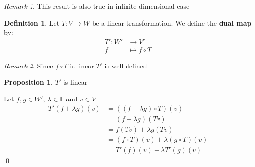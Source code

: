 \documentclass[11pt, a4paper]{report}
\makeatletter
\numberwithin{equation}{section}
\newcommand{\F}{\mathbb{F}}
\numberwithin{equation}{subsection}
\theoremstyle{plain}
\theoremstyle{definition}
\newtheorem{defn}{Definition}[chapter]
\newtheorem{prop}[thm]{Proposition}
\theoremstyle{remark}
\newtheorem*{rem}{Remark}
\newtheorem*{prf}{Proof}
\renewenvironment{prf}[1][\proofname]{\par
  \vspace{-\topsep}%
  \normalfont
  \topsep0pt \partopsep0pt %
  \trivlist
  \item[\hskip\labelsep
        \itshape
    #1\@addpunct{.}]\ignorespaces
}{%
  \popQED\endtrivlist\@endpefalse
  \addvspace{6pt plus 6pt} %
}
\newcommand{\pr}[1]{\begin{adjustwidth}{1cm}{} \begin{prf} #1 \end{prf} \end{adjustwidth}}
\makeatother
\begin{document}
\begin{rem}
This result is also true in infinite dimensional case
\end{rem}

\newpage

\begin{defn} Let $T: V \to W$ be a linear transformation. We define the \textbf{dual map} by:
\begin{align*}
T': W' &\to V'\\
	f \;\; &\mapsto f \circ T
\end{align*}
\begin{rem} Since $f \circ T$ is linear $T'$ is well defined \end{rem}
\end{defn}

\begin{prop}
$T'$ is linear

\pr{
Let $f,g \in W'$, $\lambda \in \F$ and $v \in V$
\belowdisplayskip=0pt
\begin{align*}
T'(f + \lambda g)(v)	&= ((f + \lambda g) \circ T)(v)\\
						&= (f + \lambda g)(Tv)\\
						&= f(Tv) + \lambda g(Tv)\\
						&= (f \circ T)(v) + \lambda(g \circ T)(v)\\
						&= T'(f)(v) + \lambda T'(g)(v)
\end{align*}\vspace*{-8pt}\qed
}
\end{prop}
\end{document}
